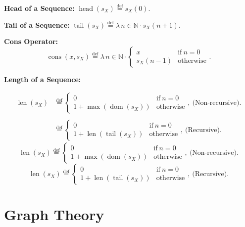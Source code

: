 \documentclass[12pt]{article}
\newcommand{\defeq}{\stackrel{\text{def}}{=}}
\DeclareMathOperator{\jdom}{dom}
\DeclareMathOperator{\jcons}{cons}
\DeclareMathOperator{\jhead}{head}
\DeclareMathOperator{\jtail}{tail}
\DeclareMathOperator{\jlen}{len}
\theoremstyle{plain}
\begin{document}
\textbf{Head of a Sequence:} $\jhead(s_X) \defeq s_X(0)$.

\textbf{Tail of a Sequence:} $\jtail(s_X) \defeq \lambda\, n \in
\mathbb{N} \cdot s_X(n + 1)$.

\textbf{Cons Operator:}
$$
\jcons(x, s_X) \defeq \lambda\, n \in \mathbb{N}
\cdot
\begin{cases}
    x          & \text{if}\ n = 0\\
    s_X(n - 1) & \text{otherwise}
\end{cases}.
$$

\textbf{Length of a Sequence:}

\begin{align*}
\jlen(s_X) &\defeq
\begin{cases}
    0                    & \text{if}\ n = 0\\
    1 + \max(\jdom(s_X)) & \text{otherwise}
\end{cases},\ \text{(Non-recursive)}.\\\\
    &\defeq
\begin{cases}
    0                   & \text{if}\ n = 0\\
    1 + \jlen(\jtail(s_X)) & \text{otherwise}
\end{cases},\ \text{(Recursive)}.
\end{align*}
$$
\jlen(s_X) \defeq
\begin{cases}
    0                   & \text{if}\ n = 0\\
    1 + \max(\jdom(s_X)) & \text{otherwise}
\end{cases},\ \text{(Non-recursive)}.
$$
$$
\jlen(s_X) \defeq
\begin{cases}
    0                   & \text{if}\ n = 0\\
    1 + \jlen(\jtail(s_X)) & \text{otherwise}
\end{cases},\ \text{(Recursive)}.
$$

\section{Graph Theory}
\end{document}
